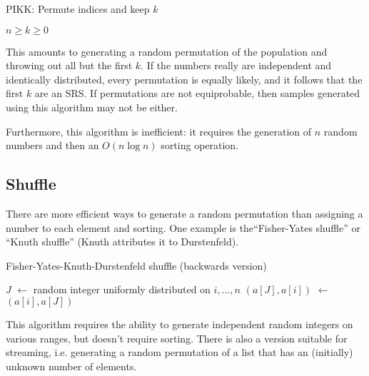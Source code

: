 \documentclass[12pt]{article}
\newcommand*\Let[2]{\State #1 $\gets$ #2}
\begin{document}
\begin{algorithm}                      %
\caption{PIKK: Permute indices and keep $k$}          %
\label{PIKK}                           %
\begin{algorithmic}[1]               %
    \Require $n \geq k \geq 0$
    \Statex
\end{algorithmic}
\end{algorithm}

This amounts to generating a random permutation of the population and throwing out all but the first $k$.
If the numbers really are independent and identically distributed, every permutation is equally likely, and it follows that the first $k$ are an SRS.
If permutations are not equiprobable, then samples generated using this algorithm may not be either.

Furthermore, this algorithm is inefficient: it requires the generation of $n$ random numbers and then an $O(n\log n)$ sorting operation.

\subsection{Shuffle}
There are more efficient ways to generate a random permutation than assigning a number to each element and sorting.
One example is the``Fisher-Yates shuffle'' or ``Knuth shuffle'' (Knuth attributes it to Durstenfeld).

\begin{algorithm}                      %
\caption{Fisher-Yates-Knuth-Durstenfeld shuffle (backwards version)}          %
\label{FYKD}                           %
\begin{algorithmic}[1]               %
    \Let{$J$}{random integer uniformly distributed on $i, \dots, n$}
    \Let{$(a[J], a[i])$}{$(a[i], a[J])$}
\EndFor
\end{algorithmic}
\end{algorithm}

This algorithm requires the ability to generate independent random integers on various ranges, but doesn't require sorting.
There is also a version suitable for streaming, i.e. generating a random permutation of a list that has an (initially) unknown number of elements.
\end{document}
